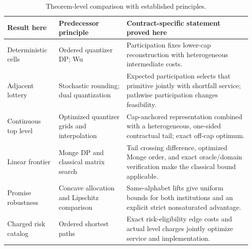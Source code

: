 \begin{table}[tb]\centering
\caption{Theorem-level comparison with established principles.}\label{tab:r37-priority}
\small\begin{tabular}{p{}p{}p{}}\toprule
Result here & Predecessor principle & Contract-specific statement proved here\\\midrule
Deterministic cells & Ordered quantizer DP; Wu & Participation fixes lower-cap reconstruction with heterogeneous intermediate costs.\\[3pt]
Adjacent lottery & Stochastic rounding; dual quantization & Expected participation selects that primitive jointly with shortfall service; pathwise participation changes feasibility.\\[3pt]
Continuous top level & Optimized quantizer grids and interpolation & Cap-anchored representation combined with a heterogeneous, one-sided contractual tail; exact off-cap optimum.\\[3pt]
Linear frontier & Monge DP and classical matrix search & Tail crossing difference, optimized Monge order, and exact oracle/domain verification make the classical bound applicable.\\[3pt]
Promise robustness & Concave allocation and Lipschitz comparison & Same-alphabet lifts give uniform bounds for both institutions and an explicit strict nonsaturated advantage.\\[3pt]
Charged risk catalog & Ordered shortest paths & Exact risk-eligibility edge costs and actual level charges jointly optimize service and implementation.\\\bottomrule
\end{tabular}
\end{table}
